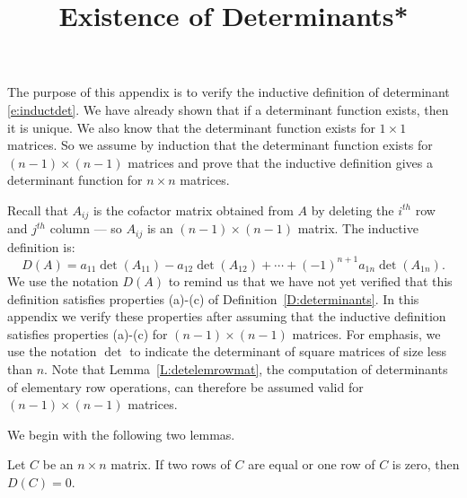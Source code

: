 \documentclass{ximera}
\title{Existence of Determinants*}
\begin{document}
\begin{abstract}
\end{abstract}
\maketitle


\label{A:det}

\newcommand{\Matrix}[1]{\ensuremath{\left[\begin{array}%
{ccccccccccccccccc} #1 \end{array}\right]}}


The purpose of this appendix is to verify the inductive
definition of determinant \eqref{e:inductdet}. We have already
shown that if a determinant function exists, then it is unique.
We also know that the determinant function exists for $1\times
1$ matrices. So we assume by induction that the determinant function
exists for $(n-1)\times(n-1)$ matrices and prove that the
inductive definition gives a determinant function for $n\times
n$ matrices.  

Recall that $A_{ij}$ is the cofactor matrix obtained from $A$ by
deleting the $i^{th}$ row and $j^{th}$ column --- so $A_{ij}$ is
an $(n-1)\times(n-1)$ matrix.  The inductive definition is:
  
\[
D(A) = a_{11}\det(A_{11})-a_{12}\det(A_{12})+\cdots 
+(-1)^{n+1}a_{1n}\det(A_{1n}).
\]
We use the notation $D(A)$ to remind us that we have not yet
verified that this definition satisfies properties (a)-(c) of
Definition~\ref{D:determinants}.  In this appendix we verify these
properties after assuming that the inductive definition
satisfies properties (a)-(c) for $(n-1)\times (n-1)$ matrices.
For emphasis, we use the notation $\det$ to indicate the
determinant of square matrices of size less than $n$.  Note 
that Lemma~\ref{L:detelemrowmat}, the computation of 
determinants of elementary row operations, can therefore 
be assumed valid for $(n-1)\times (n-1)$ matrices.

We begin with the following two lemmas.

\begin{lemma} \label{L:two_equal}
Let $C$ be an $n\times n$ matrix.  If two rows of  $C$ are equal 
or one row of $C$ is zero, then $D(C)=0$. 
\end{lemma}
\end{document}
